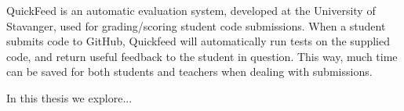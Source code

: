 
\abstract

QuickFeed is an automatic evaluation system, developed at the University of Stavanger, used for grading/scoring student code submissions. 
When a student submits code to GitHub, Quickfeed will automatically run tests on the supplied code, and return useful feedback to the student in question.
This way, much time can be saved for both students and teachers when dealing with submissions. 


In this thesis we explore...